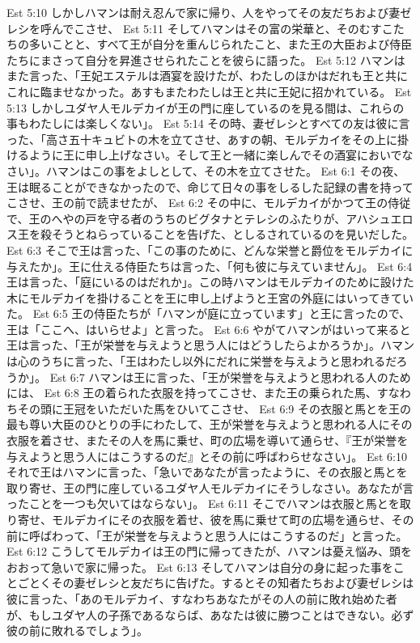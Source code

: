Est 5:10  しかしハマンは耐え忍んで家に帰り、人をやってその友だちおよび妻ゼレシを呼んでこさせ、
Est 5:11  そしてハマンはその富の栄華と、そのむすこたちの多いことと、すべて王が自分を重んじられたこと、また王の大臣および侍臣たちにまさって自分を昇進させられたことを彼らに語った。
Est 5:12  ハマンはまた言った、「王妃エステルは酒宴を設けたが、わたしのほかはだれも王と共にこれに臨ませなかった。あすもまたわたしは王と共に王妃に招かれている。
Est 5:13  しかしユダヤ人モルデカイが王の門に座しているのを見る間は、これらの事もわたしには楽しくない」。
Est 5:14  その時、妻ゼレシとすべての友は彼に言った、「高さ五十キュビトの木を立てさせ、あすの朝、モルデカイをその上に掛けるように王に申し上げなさい。そして王と一緒に楽しんでその酒宴においでなさい」。ハマンはこの事をよしとして、その木を立てさせた。
Est 6:1  その夜、王は眠ることができなかったので、命じて日々の事をしるした記録の書を持ってこさせ、王の前で読ませたが、
Est 6:2  その中に、モルデカイがかつて王の侍従で、王のへやの戸を守る者のうちのビグタナとテレシのふたりが、アハシュエロス王を殺そうとねらっていることを告げた、としるされているのを見いだした。
Est 6:3  そこで王は言った、「この事のために、どんな栄誉と爵位をモルデカイに与えたか」。王に仕える侍臣たちは言った、「何も彼に与えていません」。
Est 6:4  王は言った、「庭にいるのはだれか」。この時ハマンはモルデカイのために設けた木にモルデカイを掛けることを王に申し上げようと王宮の外庭にはいってきていた。
Est 6:5  王の侍臣たちが「ハマンが庭に立っています」と王に言ったので、王は「ここへ、はいらせよ」と言った。
Est 6:6  やがてハマンがはいって来ると王は言った、「王が栄誉を与えようと思う人にはどうしたらよかろうか」。ハマンは心のうちに言った、「王はわたし以外にだれに栄誉を与えようと思われるだろうか」。
Est 6:7  ハマンは王に言った、「王が栄誉を与えようと思われる人のためには、
Est 6:8  王の着られた衣服を持ってこさせ、また王の乗られた馬、すなわちその頭に王冠をいただいた馬をひいてこさせ、
Est 6:9  その衣服と馬とを王の最も尊い大臣のひとりの手にわたして、王が栄誉を与えようと思われる人にその衣服を着させ、またその人を馬に乗せ、町の広場を導いて通らせ、『王が栄誉を与えようと思う人にはこうするのだ』とその前に呼ばわらせなさい」。
Est 6:10  それで王はハマンに言った、「急いであなたが言ったように、その衣服と馬とを取り寄せ、王の門に座しているユダヤ人モルデカイにそうしなさい。あなたが言ったことを一つも欠いてはならない」。
Est 6:11  そこでハマンは衣服と馬とを取り寄せ、モルデカイにその衣服を着せ、彼を馬に乗せて町の広場を通らせ、その前に呼ばわって、「王が栄誉を与えようと思う人にはこうするのだ」と言った。
Est 6:12  こうしてモルデカイは王の門に帰ってきたが、ハマンは憂え悩み、頭をおおって急いで家に帰った。
Est 6:13  そしてハマンは自分の身に起った事をことごとくその妻ゼレシと友だちに告げた。するとその知者たちおよび妻ゼレシは彼に言った、「あのモルデカイ、すなわちあなたがその人の前に敗れ始めた者が、もしユダヤ人の子孫であるならば、あなたは彼に勝つことはできない。必ず彼の前に敗れるでしょう」。
